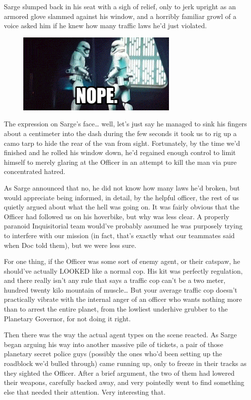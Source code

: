 Sarge slumped back in his seat with a sigh of relief, only to jerk upright as an armored glove slammed against his window, and a horribly familiar growl of a voice asked him if he knew how many traffic laws he'd just violated.

\begin{figure}
	\begin{center}
		\includegraphics[width=\figwidth]{pics/17/44.png}
	\end{center}
\end{figure}
The expression on Sarge's face… well, let's just say he managed to sink his fingers about a centimeter into the dash during the few seconds it took us to rig up a camo tarp to hide the rear of the van from sight. 
Fortunately, by the time we'd finished and he rolled his window down, he'd regained enough control to limit himself to merely glaring at the Officer in an attempt to kill the man via pure concentrated hatred.

As Sarge announced that no, he did not know how many laws he'd broken, but would appreciate being informed, in detail, by the helpful officer, the rest of us quietly argued about what the hell was going on. 
It was fairly obvious that the Officer had followed us on his hoverbike, but why was less clear. 
A properly paranoid Inquisitorial team would've probably assumed he was purposely trying to interfere with our mission (in fact, that's exactly what our teammates said when Doc told them), but we were less sure.

For one thing, if the Officer was some sort of enemy agent, or their catspaw, he should've actually LOOKED like a normal cop. 
His kit was perfectly regulation, and there really isn't any rule that says a traffic cop can't be a two meter, hundred twenty kilo mountain of muscle…  But your average traffic cop doesn't practically vibrate with the internal anger of an officer who wants nothing more than to arrest the entire planet, from the lowliest underhive grubber to the Planetary Governor, for not doing it right. 


Then there was the way the actual agent types on the scene reacted. 
As Sarge began arguing his way into another massive pile of tickets, a pair of those planetary secret police guys (possibly the ones who'd been setting up the roadblock we'd bulled through) came running up, only to freeze in their tracks as they sighted the Officer. 
After a brief argument, the two of them had lowered their weapons, carefully backed away, and very pointedly went to find something else that needed their attention. 
Very interesting that.


